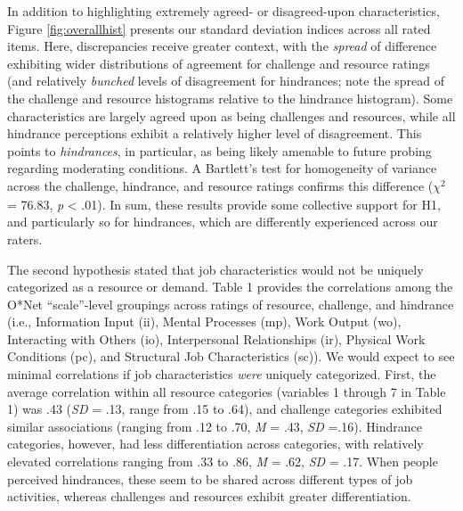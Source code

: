 \documentclass[
  man]{apa7}
\begin{document}
In addition to highlighting extremely agreed- or disagreed-upon characteristics, Figure \ref{fig:overallhist} presents our standard deviation indices across all rated items. Here, discrepancies receive greater context, with the \emph{spread} of difference exhibiting wider distributions of agreement for challenge and resource ratings (and relatively \emph{bunched} levels of disagreement for hindrances; note the spread of the challenge and resource histograms relative to the hindrance histogram). Some characteristics are largely agreed upon as being challenges and resources, while all hindrance perceptions exhibit a relatively higher level of disagreement. This points to \emph{hindrances}, in particular, as being likely amenable to future probing regarding moderating conditions. A Bartlett's test for homogeneity of variance across the challenge, hindrance, and resource ratings confirms this difference (\(\chi^2_{}\) = 76.83, \emph{p} \textless{} .01). In sum, these results provide some collective support for H1, and particularly so for hindrances, which are differently experienced across our raters.

The second hypothesis stated that job characteristics would not be uniquely categorized as a resource or demand. Table 1 provides the correlations among the O*Net ``scale''-level groupings across ratings of resource, challenge, and hindrance (i.e., Information Input (ii), Mental Processes (mp), Work Output (wo), Interacting with Others (io), Interpersonal Relationships (ir), Physical Work Conditions (pc), and Structural Job Characteristics (sc)). We would expect to see minimal correlations if job characteristics \emph{were} uniquely categorized. First, the average correlation within all resource categories (variables 1 through 7 in Table 1) was .43 (\emph{SD} = .13, range from .15 to .64), and challenge categories exhibited similar associations (ranging from .12 to .70, \emph{M} = .43, \emph{SD} =.16). Hindrance categories, however, had less differentiation across categories, with relatively elevated correlations ranging from .33 to .86, \emph{M} = .62, \emph{SD} = .17. When people perceived hindrances, these seem to be shared across different types of job activities, whereas challenges and resources exhibit greater differentiation.
\end{document}
